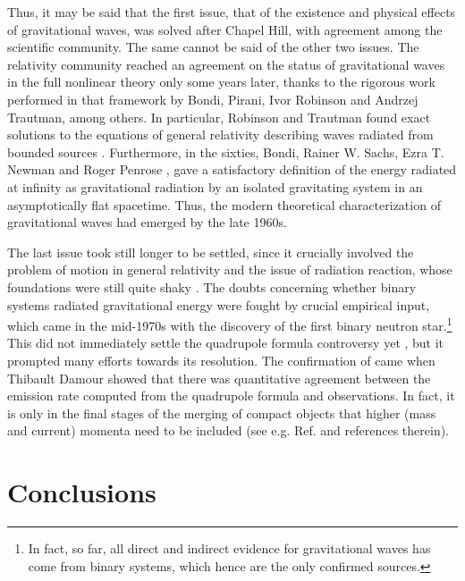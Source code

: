 \documentclass{ws-procs961x669}            %
\begin{document}
Thus, it may be said that the first issue, that of the existence
and physical effects of gravitational waves, was solved after
Chapel Hill, with agreement among the scientific community. The
same cannot be said of the other two issues. The relativity
community reached an agreement on the status of gravitational
waves in the full nonlinear theory only some years later, thanks
to the rigorous work performed in that framework by Bondi, Pirani,
Ivor Robinson and Andrzej Trautman, among others. In particular,
Robinson and Trautman found exact solutions to the equations of
general relativity describing waves radiated from bounded sources
\cite{Robinson:1960zzb}. Furthermore, in the sixties, Bondi,
Rainer W. Sachs, Ezra T. Newman and Roger Penrose
\cite{Bondi:1962px,Sachs:1962wk,Sachs:1964zza,Newman:1961qr,Penrose:1965am},
gave a satisfactory definition of the energy radiated at infinity
as gravitational radiation by an isolated gravitating system in an
asymptotically flat spacetime. Thus, the modern theoretical
characterization of gravitational waves had emerged by the late
1960s.

The last issue took still longer to be settled, since it crucially
involved the problem of motion in general relativity and the issue
of radiation reaction, whose foundations were still quite shaky
\cite{Ehlers:1976ji}. The doubts concerning whether binary systems
radiated gravitational energy were fought by crucial empirical
input, which came in the mid-1970s with the discovery of the first
binary neutron star\cite{Hulse:1974eb,HulseTaylor2}.\footnote{In
fact, so far, all direct and indirect evidence for gravitational
waves has come from binary systems, which hence are the only
confirmed sources.} This did not immediately settle the quadrupole
formula controversy yet \cite{Kennefick:2016mxm}, but it prompted
many efforts towards its resolution. The confirmation of came when
Thibault Damour\cite{Damour:1983tz} showed that there was
quantitative agreement between the emission rate computed from the
quadrupole formula and observations. In fact, it is only in the
final stages of the merging of compact objects that higher (mass
and current) momenta need to be included (see e.g. Ref.
 and references therein).

\section{Conclusions}\label{conclusions}
\end{document}
